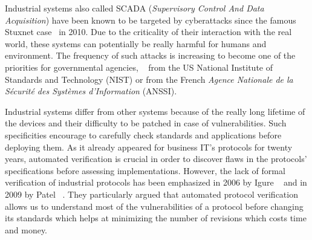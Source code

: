 Industrial systems also called SCADA (\emph{Supervisory Control And
Data Acquisition}) have been known to be targeted by cyberattacks
since the famous Stuxnet case~\cite{Lan11} in 2010.  Due to the
criticality of their interaction with the real world, these
systems can potentially be really harmful for humans and environment.
The frequency of such attacks is increasing to become one of the
priorities for governmental agencies, \eg~\cite{SFS11} from the US
National Institute of Standards and Technology (NIST) or
\cite{ANSSI12_guide_securite_industrielle_en} from the French {\em Agence
Nationale de la Sécurité des Systèmes d'Information} (ANSSI).


Industrial systems differ from other systems because of
the really long lifetime of the devices and their difficulty to
be patched in case of vulnerabilities.
Such specificities encourage to carefully check
standards and applications before deploying them.
As it already appeared for business IT's protocols for twenty years,
automated verification is crucial in order to discover flaws in the
protocols' specifications before assessing implementations. However,
the lack of formal verification of industrial protocols has been
emphasized in 2006 by Igure \etal~\cite{ILW06} and in 2009 by
Patel \emph{\etal}~\cite{PBG09}.  They particularly argued that
automated protocol verification allows us to understand most of the
vulnerabilities of a protocol before changing its standards which
helps at minimizing the number of revisions which costs time and
money. 

